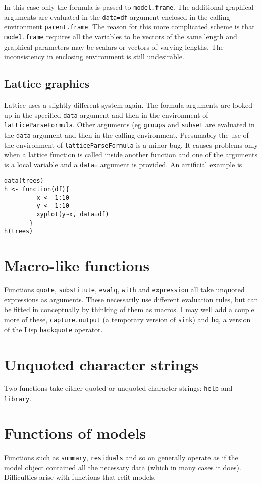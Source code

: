 \documentclass[11pt]{article}
\begin{document}
In this case only the formula is passed to \texttt{model.frame}.  The additional graphical arguments are evaluated in the  \texttt{data=df} argument enclosed in the calling environment \texttt{parent.frame}.  The reason for this more complicated scheme is that \texttt{model.frame} requires all the variables to be vectors of the same length and graphical parameters may be scalars or vectors of varying lengths. The inconsistency in enclosing environment is still undesirable.


\subsection{Lattice graphics}
Lattice uses a slightly different system again.  The formula arguments are looked up in the specified \texttt{data} argument and then in the environment of \texttt{latticeParseFormula}. Other arguments (eg \texttt{groups} and \texttt{subset} are evaluated in the \texttt{data} argument and then in the calling environment.    Presumably the use of the environment of \texttt{latticeParseFormula} is a minor bug. It causes problems only when a lattice function is called inside another function and one of the arguments is a local variable and a \texttt{data=} argument is provided.  An artificial example is
\begin{verbatim}
data(trees)
h <- function(df){
         x <- 1:10
         y <- 1:10
         xyplot(y~x, data=df)
       }
h(trees)
\end{verbatim}

\section{Macro-like functions}
Functions \texttt{quote}, \texttt{substitute}, \texttt{evalq}, \texttt{with} and \texttt{expression} all take
unquoted expressions as arguments.  These necessarily use different evaluation rules, but can be fitted in conceptually by thinking of them as macros.  I may well add a couple more of these, \texttt{capture.output} (a temporary version of \texttt{sink}) and \texttt{bq}, a version of the Lisp \texttt{backquote} operator.


\section{Unquoted character strings}
Two functions take either quoted or unquoted character strings: \texttt{help} and \texttt{library}. 


\section{Functions of models}
Functions such as \texttt{summary}, \texttt{residuals} and so on
generally operate as if the model object contained all the necessary
data (which in many cases it does).  Difficulties arise with functions
that refit models.
\end{document}
